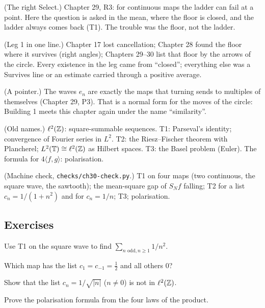 \begin{lines}
\item[\lab{R1}] (The right Select.) Chapter 29, R3: for continuous maps the ladder can fail at a point. Here the question is asked in the mean, where the floor is closed, and the ladder always comes back (T1). The trouble was the floor, not the ladder.
\item[\lab{R2}] (Leg 1 in one line.) Chapter 17 lost cancellation; Chapter 28 found the floor where it survives (right angles); Chapters 29--30 list that floor by the arrows of the circle. Every existence in the leg came from ``closed''; everything else was a Survives line or an estimate carried through a positive average.
\item[\lab{R3}] (A pointer.) The waves $e_n$ are exactly the maps that turning sends to multiples of themselves (Chapter 29, P3). That is a normal form for the moves of the circle: Building 1 meets this chapter again under the name ``similarity''.
\item[\lab{R4}] (Old names.) $\ell^2(\mathbb{Z})$: square-summable sequences. T1: Parseval's identity; convergence of Fourier series in $L^2$. T2: the Riesz--Fischer theorem with Plancherel; $L^2(\mathbb{T}) \cong \ell^2(\mathbb{Z})$ as Hilbert spaces. T3: the Basel problem (Euler). The formula for $4\langle f, g \rangle$: polarisation.
\item[\lab{R5}] (Machine check, \texttt{checks/ch30-check.py}.) T1 on four maps (two continuous, the square wave, the sawtooth); the mean-square gap of $S_N f$ falling; T2 for a list $c_n = 1/(1 + n^2)$ and for $c_n = 1/n$; T3; polarisation.
\end{lines}

\subsection*{Exercises}

\begin{lines}
\item[\lab{E1}] Use T1 on the square wave to find $\sum_{n \text{ odd}, n \ge 1} 1/n^2$.
\item[\lab{E2}] Which map has the list $c_1 = c_{-1} = \tfrac12$ and all others $0$?
\item[\lab{E3}] Show that the list $c_n = 1/\sqrt{|n|}$ ($n \ne 0$) is not in $\ell^2(\mathbb{Z})$.
\item[\lab{E4}] Prove the polarisation formula from the four laws of the product.
\end{lines}

